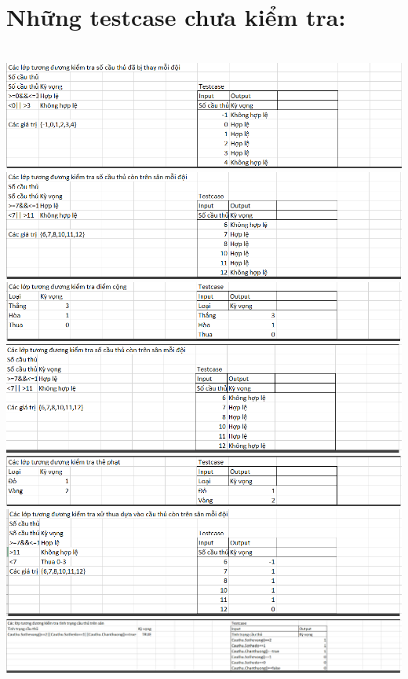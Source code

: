 \documentclass[a4paper]{article}
\begin{document}
\section{Những testcase chưa kiểm tra:}\\
\includegraphics[scale=0.75]{hinh16.png}\\
\includegraphics[scale=0.75]{hinh17.png}\\
\includegraphics[scale=0.75]{hinh18.png}\\
\includegraphics[scale=0.75]{hinh19.png}\\
\includegraphics[scale=0.75]{hinhh20.png}\\
\includegraphics[scale=0.75]{hinh21.png}\\
\includegraphics[scale=0.45]{hinh23.png}\\
\end{document}
